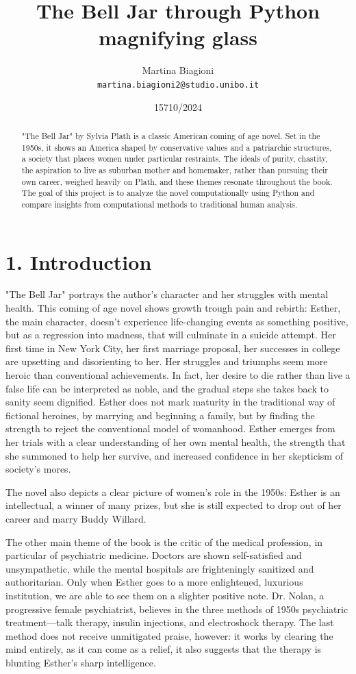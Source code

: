 \documentclass[11pt]{article}
\title{The Bell Jar through Python magnifying glass}
\author{Martina Biagioni \\
  {\tt martina.biagioni2@studio.unibo.it} }
\date{15710/2024}
\begin{document}
\maketitle
\begin{abstract}
"The Bell Jar" by Sylvia Plath is a classic American coming of age novel. Set in the 1950s, it shows an America shaped by conservative values and a patriarchic structures, a society that places women under particular restraints. The ideals of purity, chastity, the aspiration to live as suburban mother and homemaker, rather than pursuing their own career, weighed heavily on Plath, and these themes resonate throughout the book.
The goal of this project is to analyze the novel computationally using Python and compare insights from computational methods to traditional human analysis.

\end{abstract}


\section{1. Introduction}
"The Bell Jar" portrays the author’s character and her struggles with mental health. This coming of age novel shows growth trough pain and rebirth: Esther, the main character, doesn't experience life-changing events as something positive, but as a regression into madness, that will culminate in a suicide attempt. 
Her first time in New York City, her first marriage proposal, her successes in college are upsetting and disorienting to her. Her struggles and triumphs seem more heroic than conventional achievements. In fact, her desire to die rather than live a false life can be interpreted as noble, and the gradual steps she takes back to sanity seem dignified. Esther does not mark maturity in the traditional way of fictional heroines, by marrying and beginning a family, but by finding the strength to reject the conventional model of womanhood. Esther emerges from her trials with a clear understanding of her own mental health, the strength that she summoned to help her survive, and increased confidence in her skepticism of society’s mores.

The novel also depicts a clear picture of women's role in the 1950s: Esther is an intellectual, a winner of many prizes, but she is still expected to drop out of her career and marry Buddy Willard.

The other main theme of the book is the critic of the medical profession, in particular of psychiatric medicine. Doctors are shown self-satisfied and unsympathetic, while the mental hospitals are frighteningly sanitized and authoritarian. Only when Esther goes to a more enlightened, luxurious institution, we are able to see them on a slighter positive note. Dr. Nolan, a progressive female psychiatrist, believes in the three methods of 1950s psychiatric treatment—talk therapy, insulin injections, and electroshock therapy. The last method does not receive unmitigated praise, however: it works by clearing the mind entirely, as it can come as a relief, it also suggests that the therapy is blunting Esther’s sharp intelligence.
\end{document}
